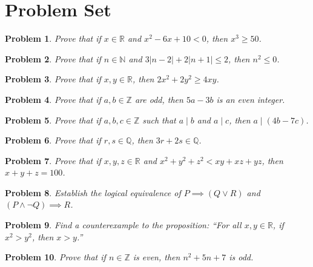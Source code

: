\documentclass[12pt]{article}
\newtheorem{problem}{Problem}
\begin{document}
\newpage

\section{Problem Set}
\label{sec:problems}

\begin{problem}
Prove that if $x \in \mathbb{R}$ and $x^2 - 6x + 10 < 0$, then $x^3 \ge 50$.
\end{problem}

\begin{problem}
Prove that if $n \in \mathbb{N}$ and $3|n - 2| + 2|n + 1| \le 2$, then $n^2 \le 0$.
\end{problem}

\begin{problem}
Prove that if $x, y \in \mathbb{R}$, then $2x^2 + 2y^2 \ge 4xy$.
\end{problem}

\begin{problem}
Prove that if $a, b \in \mathbb{Z}$ are odd, then $5a - 3b$ is an even integer.
\end{problem}

\begin{problem}
Prove that if $a, b, c \in \mathbb{Z}$ such that $a \mid b$ and $a \mid c$, then $a \mid (4b - 7c)$.
\end{problem}

\begin{problem}
Prove that if $r, s \in \mathbb{Q}$, then $3r + 2s \in \mathbb{Q}$.
\end{problem}

\begin{problem}
Prove that if $x, y, z \in \mathbb{R}$ and $x^2 + y^2 + z^2 < xy + xz + yz$, then $x+y+z = 100$.
\end{problem}

\begin{problem}
Establish the logical equivalence of $P \implies (Q \lor R)$ and $(P \land \neg Q) \implies R$.
\end{problem}

\begin{problem}
Find a counterexample to the proposition: ``For all $x, y \in \mathbb{R}$, if $x^2 > y^2$, then $x > y$.''
\end{problem}

\begin{problem}
Prove that if $n \in \mathbb{Z}$ is even, then $n^2 + 5n + 7$ is odd.
\end{problem}
\end{document}
